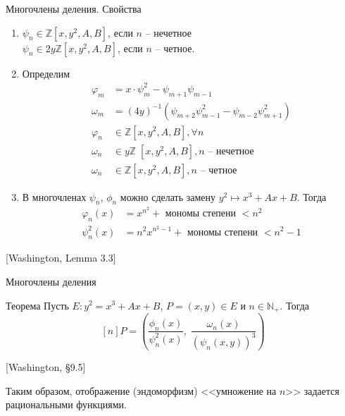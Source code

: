 \documentclass{beamer}
\begin{document}
\begin{frame}{Многочлены деления. Свойства}
\begin{enumerate}
    \item 
    ${\psi _n} \in \mathbb{Z}[x, y^2, A, B]$, если $n$ -- нечетное \\
    ${\psi _n} \in 2y\mathbb{Z}[x, y^2, A, B]$, если $n$ -- четное. 
    \item Определим
    \begin{align*}
        {\varphi _m} &= x \cdot \psi _m^2 - {\psi _{m + 1}}{\psi _{m - 1}} \\
        {\omega _m} &= {\left( {4y} \right)^{ - 1}}\left( {{\psi _{m + 2}}\psi _{m - 1}^2 - {\psi _{m - 2}}\psi _{m + 1}^2} \right) \\
        {\varphi _n} &\in \mathbb{Z}\left[ {x, {y^2},A,B} \right], \forall n \\
        {\omega _n} &\in y\mathbb{Z}\;\left[ {x, {y^2},A,B} \right], n{\text{  --  нечетное}} \\
        {\omega _n} &\in \mathbb{Z}\left[ {x, {y^2},A,B} \right],n{\text{ -- четное}}
    \end{align*}
    
    
    \item В многочленах ${\psi _n}$, ${\phi _n}$ можно сделать замену ${y^2} \mapsto {x^3} + Ax + B$. %
    Тогда 
    \begin{align*}
        {\varphi _n}\left( x \right) &= {x^{{n^2}}} + {\text{ мономы степени }} < {n^2} \\
        \psi _n^2\left( x \right) &= {n^2}{x^{{n^2} - 1}} + {\text{ мономы степени }} < {n^2} - 1
    \end{align*}
\end{enumerate}
\ProofBegin {} [Washington, Lemma 3.3] \ProofEnd
\end{frame}

\begin{frame}{Многочлены деления}
\begin{block}{Теорема}
    Пусть $E: {y^2} = {x^3} + Ax + B$, $P = \left( {x,y} \right) \in E$ и $n \in {\mathbb{N}_+ }$. Тогда
    \[[n] P = \left( {\frac{{{\phi _n}\left( x \right)}}{{\psi _n^2\left( x \right)}},\;\frac{{{\omega _n}\left( x \right)}}{{{{\left( {{\psi _n}\left( {x,y} \right)} \right)}^3}}}} \right)
    \]
\end{block}

\ProofBegin {} [Washington, \S9.5] \ProofEnd
\vspace{1em}

Таким образом, отображение (эндоморфизм) <<умножение на $n$>> задается рациональными функциями.
\end{frame}
\end{document}
